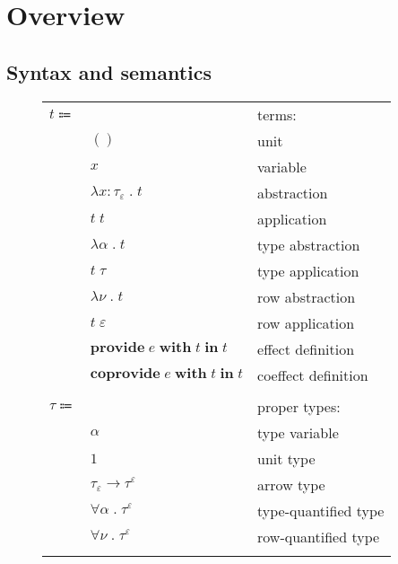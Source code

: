 \documentclass[12pt]{article}
\newcommand\anno[2]{#1 : #2}
\newcommand\term{t}
\newcommand\eunit{()}
\newcommand\evar{x}
\newcommand\eabs[2]{\lambda #1 \; . \; #2}
\newcommand\eapp[2]{#1 \; #2}
\newcommand\etabs[2]{\lambda #1 \; . \; #2}
\newcommand\etapp[2]{#1 \; #2}
\newcommand\eprovide[3]{\textbf{provide} \; #1 \; \textbf{with} \; #2 \; \textbf{in} \; #3}
\newcommand\ecoprovide[3]{\textbf{coprovide} \; #1 \; \textbf{with} \; #2 \; \textbf{in} \; #3}
\newcommand\tembellished[3]{{#1}^{#2}_{#3}}
\newcommand\proper{\tau}
\newcommand\tvar{\alpha}
\newcommand\tunit{1}
\newcommand\tarrow[2]{#1 \rightarrow #2}
\newcommand\tforall[2]{\forall #1 \; . \; #2}
\newcommand\row{\varepsilon}
\newcommand\rvar{\nu}
\newcommand\effect{e}
\begin{document}
  \section{Overview}

    \subsection{Syntax and semantics}

      \begin{figure}[H]
        \begin{mdframed}[backgroundcolor=none]
          \begin{center}
            \begin{tabular}{l l l}
              $\term \Coloneqq $ & & terms: \\
              & $\eunit$ & unit \\
              & $\evar$ & variable \\
              & $\eabs{\anno{\evar}{\tembellished{\proper}{}{\row}}}{\term}$ & abstraction \\
              & $\eapp{\term}{\term}$ & application \\
              & $\etabs{\tvar}{\term}$ & type abstraction \\
              & $\etapp{\term}{\proper}$ & type application \\
              & $\etabs{\rvar}{\term}$ & row abstraction \\
              & $\etapp{\term}{\row}$ & row application \\
              & $\eprovide{\effect}{\term}{\term}$ & effect definition \\
              & $\ecoprovide{\effect}{\term}{\term}$ & coeffect definition \\
              \\
              $\proper \Coloneqq$ & & proper types: \\
              & $\tvar$ & type variable \\
              & $\tunit$ & unit type \\
              & $\tarrow{\tembellished{\proper}{}{\row}}{\tembellished{\proper}{\row}{}}$ & arrow type \\
              & $\tforall{\tvar}{\tembellished{\proper}{\row}{}}$ & type-quantified type \\
              & $\tforall{\rvar}{\tembellished{\proper}{\row}{}}$ & row-quantified type \\
              \\

\end{tabular}
\end{center}
\end{mdframed}
\end{figure}
\end{document}

